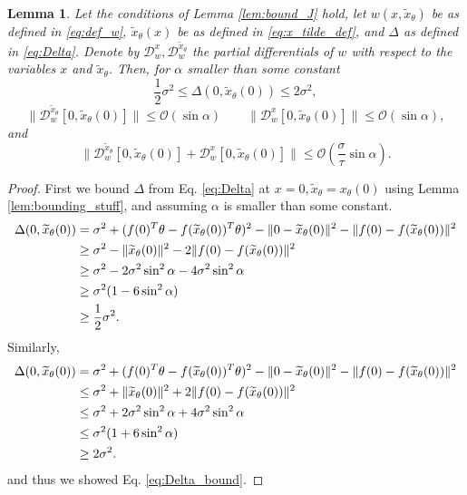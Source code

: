 \documentclass[12pt]{article}
\newtheorem{Lemma}[Theorem]{Lemma}
\theoremstyle{remark}
\newcommand{\DD}{\mathcal{D}}
\newcommand{\wtilde}[1]{\widetilde{#1}}
\begin{document}
\begin{appendices}
\begin{Lemma}\label{lem:Dxtildew+Dxw}
Let the conditions of Lemma \ref{lem:bound_J} hold, let $w(x, \wtilde x_\theta)$ be as defined in \eqref{eq:def_w}, $\wtilde x_\theta(x)$ be as defined in \eqref{eq:x_tilde_def}, and $\Delta$ as defined in \eqref{eq:Delta}. 
Denote by $\DD^x_w, \DD^{\wtilde{x}_\theta}_w$ the partial differentials of $w$ with respect to the variables $x$ and $\wtilde x_\theta$.
Then, for $\alpha$ smaller than some constant
\begin{equation}\label{eq:Delta_bound}
    \frac{1}{2} \sigma^2 \leq \Delta(0,\wtilde x_\theta (0)) \leq 2 \sigma^2
,\end{equation}
\begin{equation} \label{eq:Dws_bound}
\| \DD^{\wtilde{x}_\theta}_ w[0, \wtilde x_\theta(0)] \| \leq  \mathcal{O}(\sin \alpha) \qquad \|\DD^x_w[0, \wtilde x_\theta(0)]\| \leq \mathcal{O}(\sin \alpha)
,\end{equation}
and
\begin{equation}\label{eq:Dxtildew+Dxw_bound}
\| \DD^{\wtilde{x}_\theta}_w[0, \wtilde x_\theta(0)] + \DD^x_w[0, \wtilde x_\theta(0)]\| \leq \mathcal{O}(\frac{\sigma}{\tau}\sin \alpha)
.\end{equation}
\end{Lemma}
\begin{proof}
First we bound $\Delta$ from Eq. \eqref{eq:Delta} at $x=0,\wtilde x_\theta = x_\theta(0)$ using Lemma \ref{lem:bounding_stuff}, and assuming $\alpha$ is smaller than some constant.
\begin{align}
\Delta(0,\wtilde x_\theta (0)) &= \sigma^2 + (f(0)^T \theta - f(\wtilde{x}_\theta(0))^T \theta)^2 - \|0- \wtilde{x}_\theta(0)\|^2 - \|f(0)- f(\wtilde{x}_\theta(0)) \|^2 
\notag\\
&\geq \sigma^2 -\|\wtilde{x}_\theta(0)\|^2 - 2\|f(0)- f(\wtilde{x}_\theta(0)) \|^2
\notag\\
&\geq \sigma^2 -2\sigma^2 \sin^2 \alpha - 4\sigma^2 \sin^2 \alpha 
\notag\\
&\geq \sigma^2(1-6\sin^2 \alpha )
\notag\\
&\geq \frac{1}{2} \sigma^2
.\end{align}
Similarly, 
\begin{align}
\Delta(0,\wtilde x_\theta (0)) &= \sigma^2 + (f(0)^T \theta - f(\wtilde{x}_\theta(0))^T \theta)^2 - \|0- \wtilde{x}_\theta(0)\|^2 - \|f(0)- f(\wtilde{x}_\theta(0)) \|^2 
\notag\\
&\leq \sigma^2 +\|\wtilde{x}_\theta(0)\|^2 + 2\|f(0)- f(\wtilde{x}_\theta(0)) \|^2
\notag\\
&\leq \sigma^2 +2\sigma^2 \sin^2 \alpha + 4\sigma^2 \sin^2 \alpha 
\notag\\
&\leq \sigma^2(1+6\sin^2 \alpha )
\notag\\
&\geq 2 \sigma^2
.\end{align}
and thus we showed Eq. \eqref{eq:Delta_bound}.


\end{proof}
\end{appendices}
\end{document}
